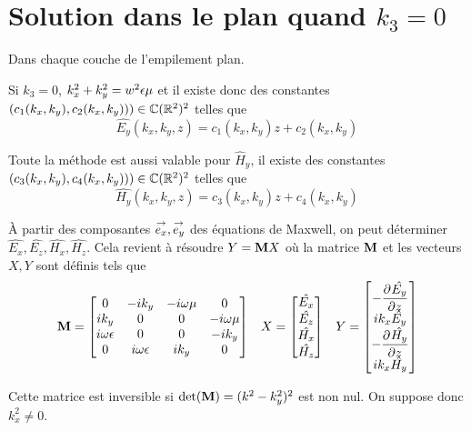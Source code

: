 \section[Solution dans le plan quand k3 = 0]{Solution dans le plan quand \(k_3 = 0\)}
  \label{sec:annexe:plan:k3_nul}

  Dans chaque couche de l'empilement plan.

  Si \(k_3 = 0\), \(k_x^2 + k_y^2 = w^2\eps\mu\) et il existe donc des constantes \((c_1(k_x,k_y),c_2(k_x,k_y))) \in \CC(\RR^2)^2\) telles que
  \begin{equation*}
    \hat{E_y}(k_x,k_y,z) = c_1(k_x,k_y) z + c_2(k_x,k_y)
  \end{equation*}

  Toute la méthode est aussi valable pour \(\hat H_y\), il existe des constantes \((c_3(k_x,k_y),c_4(k_x,k_y))) \in \CC(\RR^2)^2\) telles que
  \begin{equation*}
    \hat{H_y}(k_x,k_y,z) = c_3(k_x,k_y) z + c_4(k_x,k_y)
  \end{equation*}

  À partir des composantes \(\vect{e_x},\vect{e_y}\) des équations de Maxwell, on peut déterminer \(\hat{E_x},\hat{E_z},\hat{H_x},\hat{H_z}\).
  Cela revient à résoudre \(Y = \mM X\) où la matrice \(\mM\) et les vecteurs \(X, Y\) sont définis tels que
  \begin{align*}
    \mM =
    \begin{bmatrix}
    0 & -ik_y & -i\w\mu & 0
    \\
    ik_y & 0 & 0 & -i\w\mu
    \\
    i\w\eps & 0 & 0 & -ik_y
    \\
    0 & i\w\eps & ik_y & 0
    \end{bmatrix}
    &&
    X =
    \begin{bmatrix}
      \hat{E_x}\\
      \hat{E_z}\\
      \hat{H_x}\\
      \hat{H_z}
    \end{bmatrix}
    &&
    Y =
    \begin{bmatrix}
      -\ddr{z}{\hat{E_y}}\\
      ik_x\hat{E_y}\\
      -\ddr{z}{\hat{H_y}}\\
      ik_x\hat{H_y}
    \end{bmatrix}
  \end{align*}

  Cette matrice est inversible si \(\det(\mM) = (k^2 - k_y^2)^2 \) est non nul. On suppose donc \(k_x^2\not=0\).

